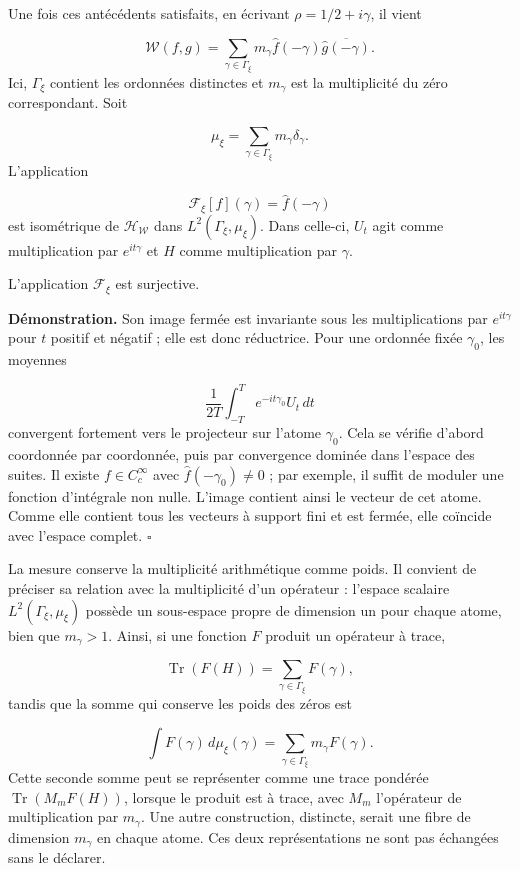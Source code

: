 Une fois ces antécédents satisfaits, en écrivant \(\rho=1/2+i\gamma\), il vient

\[
\mathscr W(f,g)
=\sum_{\gamma\in\Gamma_\xi}
m_\gamma\widehat f(-\gamma)\overline{\widehat g(-\gamma)}.
\]
Ici, \(\Gamma_\xi\) contient les ordonnées distinctes et \(m_\gamma\) est la multiplicité du zéro correspondant. Soit

\[
\mu_\xi=\sum_{\gamma\in\Gamma_\xi}m_\gamma\delta_\gamma.
\]
L'application

\[
\mathcal F_\xi[f](\gamma)=\widehat f(-\gamma)
\]
est isométrique de \(\mathcal H_{\mathscr W}\) dans \(L^2(\Gamma_\xi,\mu_\xi)\). Dans celle-ci, \(U_t\) agit comme multiplication par \(e^{it\gamma}\) et \(H\) comme multiplication par \(\gamma\).

L'application \(\mathcal F_\xi\) est surjective.

\textbf{Démonstration.} Son image fermée est invariante sous les multiplications par \(e^{it\gamma}\) pour \(t\) positif et négatif ; elle est donc réductrice. Pour une ordonnée fixée \(\gamma_0\), les moyennes

\[
\frac1{2T}\int_{-T}^T e^{-it\gamma_0}U_t\,dt
\]
convergent fortement vers le projecteur sur l'atome \(\gamma_0\). Cela se vérifie d'abord coordonnée par coordonnée, puis par convergence dominée dans l'espace des suites. Il existe \(f\in C_c^\infty\) avec \(\widehat f(-\gamma_0)\neq0\) ; par exemple, il suffit de moduler une fonction d'intégrale non nulle. L'image contient ainsi le vecteur de cet atome. Comme elle contient tous les vecteurs à support fini et est fermée, elle coïncide avec l'espace complet. \hfill\(\square\)

La mesure conserve la multiplicité arithmétique comme poids. Il convient de préciser sa relation avec la multiplicité d'un opérateur : l'espace scalaire \(L^2(\Gamma_\xi,\mu_\xi)\) possède un sous-espace propre de dimension un pour chaque atome, bien que \(m_\gamma>1\). Ainsi, si une fonction \(F\) produit un opérateur à trace,

\[
\operatorname{Tr}(F(H))=\sum_{\gamma\in\Gamma_\xi}F(\gamma),
\]
tandis que la somme qui conserve les poids des zéros est

\[
\int F(\gamma)\,d\mu_\xi(\gamma)
=\sum_{\gamma\in\Gamma_\xi}m_\gamma F(\gamma).
\]
Cette seconde somme peut se représenter comme une trace pondérée \(\operatorname{Tr}(M_mF(H))\), lorsque le produit est à trace, avec \(M_m\) l'opérateur de multiplication par \(m_\gamma\). Une autre construction, distincte, serait une fibre de dimension \(m_\gamma\) en chaque atome. Ces deux représentations ne sont pas échangées sans le déclarer.

